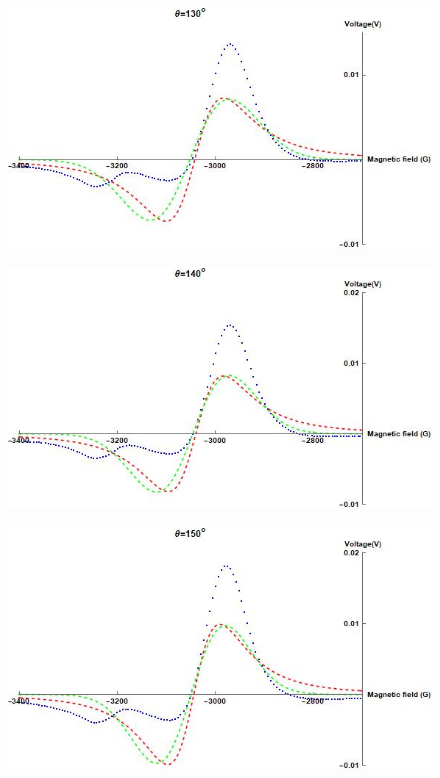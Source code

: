\documentclass[openany,11pt,a4paper]{report}
\begin{document}
\begin{figure}[H]
\centering
\includegraphics[scale=0.6]{130.jpg}
\end{figure}


\begin{figure}[H]
\centering
\includegraphics[scale=0.6]{140.jpg}
\end{figure}


\begin{figure}[H]
\centering
\includegraphics[scale=0.6]{150.jpg}\end{figure}
\end{document}
